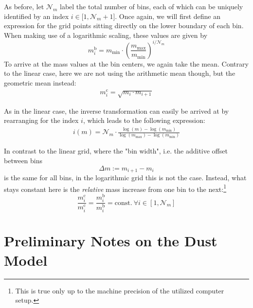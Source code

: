         As before, let $\mathcal N_m$ label the total number of bins, each of which can be uniquely 
        identified by an index $i\in\mathcal[1,\mathcal N_m+1]$. Once again, we will first define 
        an expression for the grid points sitting directly on the lower boundary of each bin. When
        making use of a logarithmic scaling, these values are given by
        \begin{equation}
            m_i^\text{b}
                =m_\text{min}\cdot\left(\frac{m_\text{max}}{m_\text{min}}\right)^{i/\mathcal N_m}
        \end{equation}
        To arrive at the mass values at the bin centers, we again take the mean. Contrary to the 
        linear case, here we are not using the arithmetic mean though, but the geometric mean
        instead:
        \begin{align}
            m_i^\text{c}
                =\sqrt{m_i\cdot m_{i+1}}
        \end{align}
    
        As in the linear case, the inverse transformation can easily be arrived at by rearranging
        for the index $i$, which leads to the following expression:
        \begin{align}
            i(m) = \mathcal N_m\cdot \frac{
                \log(m)-\log(m_\text{min})
            }{
                \log(m_\text{max})-\log(m_\text{min})
            }
        \end{align}
        
        In contrast to the linear grid, where the "bin width", i.e. the additive offset between bins
        \begin{equation}
            \Delta m := m_{i+1} - m_i
        \end{equation}
        is the same for all bins, in the logarithmic grid this is not the case. Instead, what stays
        constant here is the \textit{relative} mass increase from one bin to the next:\footnote{This
        is true only up to the machine precision of the utilized computer setup.}
        \begin{equation}
            \frac{m_i^\text{c}}{m_i^\text{c}}
                =\frac{m_i^\text{b}}{m_i^\text{b}}
                =\text{const.}\ \forall i\in[1,\mathcal N_m]
        \end{equation}


\clearpage\section{Preliminary Notes on the Dust Model}
\label{sec:preliminary_notes_on_the_dust_model}

